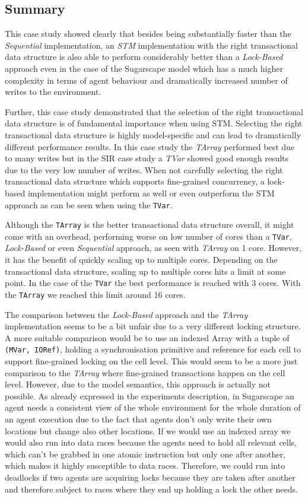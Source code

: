 \subsection{Summary}
This case study showed clearly that besides being substantially faster than the \textit{Sequential} implementation, an \textit{STM} implementation with the right transactional data structure is also able to perform considerably better than a \textit{Lock-Based} approach even in the case of the Sugarscape model which has a much higher complexity in terms of agent behaviour and dramatically increased number of writes to the environment.

Further, this case study demonstrated that the selection of the right transactional data structure is of fundamental importance when using STM. Selecting the right transactional data structure is highly model-specific and can lead to dramatically different performance results. In this case study the \textit{TArray} performed best due to many writes but in the SIR case study a \textit{TVar} showed good enough results due to the very low number of writes. When not carefully selecting the right transactional data structure which supports fine-grained concurrency, a lock-based implementation might perform as well or even outperform the STM approach as can be seen when using the \texttt{TVar}.

Although the \texttt{TArray} is the better transactional data structure overall, it might come with an overhead, performing worse on low number of cores than a \texttt{TVar}, \textit{Lock-Based} or even \textit{Sequential} approach, as seen with \textit{TArray} on 1 core. However, it has the benefit of quickly scaling up to multiple cores. Depending on the transactional data structure, scaling up to multiple cores hits a limit at some point. In the case of the \texttt{TVar} the best performance is reached with 3 cores. With the \texttt{TArray} we reached this limit around 16 cores.

The comparison between the \textit{Lock-Based} approach and the \textit{TArray} implementation seems to be a bit unfair due to a very different locking structure. A more suitable comparison would be to use an indexed Array with a tuple of \texttt{(MVar, IORef)}, holding a synchronisation primitive and reference for each cell to support fine-grained locking on the cell level. This would seem to be a more just comparison to the \textit{TArray} where fine-grained transactions happen on the cell level. However, due to the model semantics, this approach is actually not possible. As already expressed in the experiments description, in Sugarscape an agent needs a consistent view of the whole environment for the whole duration of an agent execution due to the fact that agents don't only write their own locations but change also other locations. If we would use an indexed array we would also run into data races because the agents need to hold all relevant cells, which can't be grabbed in one atomic instruction but only one after another, which makes it highly susceptible to data races. Therefore, we could run into deadlocks if two agents are acquiring locks because they are taken after another and therefore subject to races where they end up holding a lock the other needs.